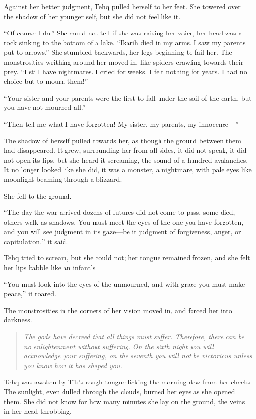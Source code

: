 Against her better judgment, Tehq pulled herself to her feet. She towered over the shadow of her younger self, but she did not feel like it.

``Of course I do.'' She could not tell if she was raising her voice, her head was a rock sinking to the bottom of a lake. ``Ikarih died in my arms. I saw my parents put to arrows.'' She stumbled backwards, her legs beginning to fail her. The monstrosities writhing around her moved in, like spiders crawling towards their prey. ``I still have nightmares. I cried for weeks. I felt nothing for years. I had no choice but to mourn them!''

``Your sister and your parents were the first to fall under the soil of the earth, but you have not mourned all.''

``Then tell me what I have forgotten! My sister, my parents, my innocence---''

The shadow of herself pulled towards her, as though the ground between them had disappeared. It grew, surrounding her from all sides, it did not speak, it did not open its lips, but she heard it screaming, the sound of a hundred avalanches. It no longer looked like she did, it was a monster, a nightmare, with pale eyes like moonlight beaming through a blizzard.

She fell to the ground.

``The day the war arrived dozens of futures did not come to pass, some died, others walk as shadows. You must meet the eyes of the one you have forgotten, and you will see judgment in its gaze---be it judgment of forgiveness, anger, or capitulation,'' it said.

Tehq tried to scream, but she could not; her tongue remained frozen, and she felt her lips babble like an infant's.

``You must look into the eyes of the unmourned, and with grace you must make peace,'' it roared.

The monstrosities in the corners of her vision moved in, and forced her into darkness.

\begin{quote}
\emph{The gods have decreed that all things must suffer. Therefore, there can be no enlightenment without suffering. On the sixth night you will acknowledge your suffering, on the seventh you will not be victorious unless you know how it has shaped you.}
\end{quote}

\noindent Tehq was awoken by Tik's rough tongue licking the morning dew from her cheeks. The sunlight, even dulled through the clouds, burned her eyes as she opened them. She did not know for how many minutes she lay on the ground, the veins in her head throbbing.

